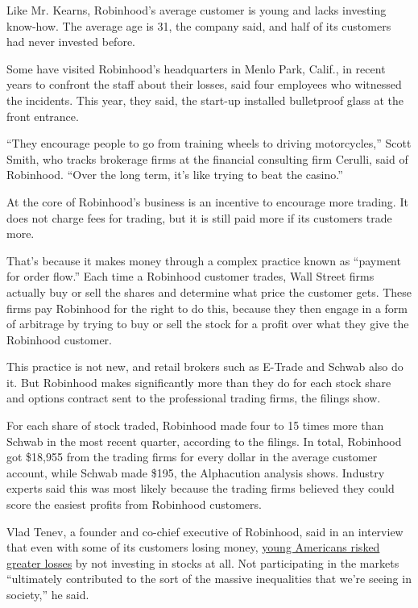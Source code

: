 Like Mr. Kearns, Robinhood's average customer is young and lacks
investing know-how. The average age is 31, the company said, and half of
its customers had never invested before.

Some have visited Robinhood's headquarters in Menlo Park, Calif., in
recent years to confront the staff about their losses, said four
employees who witnessed the incidents. This year, they said, the
start-up installed bulletproof glass at the front entrance.

``They encourage people to go from training wheels to driving
motorcycles,'' Scott Smith, who tracks brokerage firms at the financial
consulting firm Cerulli, said of Robinhood. ``Over the long term, it's
like trying to beat the casino.''

At the core of Robinhood's business is an incentive to encourage more
trading. It does not charge fees for trading, but it is still paid more
if its customers trade more.

That's because it makes money through a complex practice known as
``payment for order flow.'' Each time a Robinhood customer trades, Wall
Street firms actually buy or sell the shares and determine what price
the customer gets. These firms pay Robinhood for the right to do this,
because they then engage in a form of arbitrage by trying to buy or sell
the stock for a profit over what they give the Robinhood customer.

This practice is not new, and retail brokers such as E-Trade and Schwab
also do it. But Robinhood makes significantly more than they do for each
stock share and options contract sent to the professional trading firms,
the filings show.

For each share of stock traded, Robinhood made four to 15 times more
than Schwab in the most recent quarter, according to the filings. In
total, Robinhood got \$18,955 from the trading firms for every dollar in
the average customer account, while Schwab made \$195, the Alphacution
analysis shows. Industry experts said this was most likely because the
trading firms believed they could score the easiest profits from
Robinhood customers.

Vlad Tenev, a founder and co-chief executive of Robinhood, said in an
interview that even with some of its customers losing money,
\href{https://www.nytimes3xbfgragh.onion/2020/04/06/business/millennials-economic-crisis-virus.html}{young
Americans risked greater losses} by not investing in stocks at all. Not
participating in the markets ``ultimately contributed to the sort of the
massive inequalities that we're seeing in society,'' he said.

